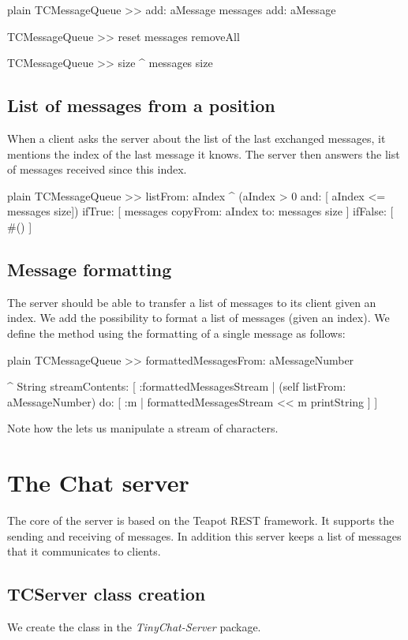 \documentclass[10pt,twoside,english]{_support/latex/sbabook/sbabook}
\begin{document}
\begin{displaycode}{plain}
TCMessageQueue >> add: aMessage
	messages add: aMessage 

TCMessageQueue >> reset
	messages removeAll

TCMessageQueue >> size
	^ messages size
\end{displaycode}
\subsection{List of messages from a position }
When a client asks the server about the list of the last exchanged messages, it mentions the index of the last
message it knows. The server then answers the list of messages received since this index.

\begin{displaycode}{plain}
TCMessageQueue >> listFrom: aIndex
	^ (aIndex > 0 and: [ aIndex <= messages size]) 
		ifTrue: [ messages copyFrom: aIndex to: messages size ]
		ifFalse: [ #() ]
\end{displaycode}
\subsection{Message formatting}
The server should be able to transfer a list of messages to its client given an index.
We add the possibility to format a list of messages (given an index).
We define the method  using the formatting of a single message as follows:

\begin{displaycode}{plain}
TCMessageQueue >> formattedMessagesFrom: aMessageNumber
	
	^ String streamContents: [ :formattedMessagesStream |  
		(self listFrom: aMessageNumber) 
			do: [ :m | formattedMessagesStream << m printString ] 
		]
\end{displaycode}

Note how the  lets us manipulate a stream of characters. 
\section{The Chat server}
The core of the server is based on the Teapot REST framework. It supports the sending and receiving of messages.
In addition this server keeps a list of messages that it communicates to clients. 
\subsection{TCServer class creation}
We create the class  in the \textit{TinyChat-Server} package. 
\end{document}
